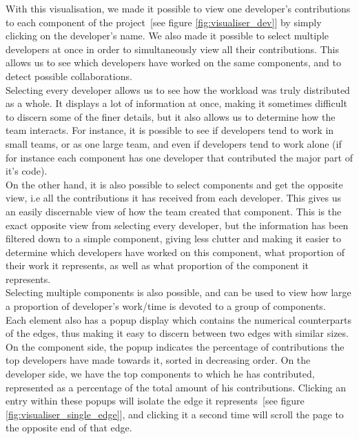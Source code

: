 With this visualisation, we made it possible to view one developer's contributions to each component of the project~[see figure \ref{fig:visualiser_dev}] by simply clicking on the developer's name. We also made it possible to select multiple developers at once in order to simultaneously view all their contributions. This allows us to see which developers have worked on the same components, and to detect possible collaborations.\\
Selecting every developer allows us to see how the workload was truly distributed as a whole. It displays a lot of information at once, making it sometimes difficult to discern some of the finer details, but it also allows us to determine how the team interacts.
For instance, it is possible to see if developers tend to work in small teams, or as one large team, and even if developers tend to work alone (if for instance each component has one developer that contributed the major part of it's code).\\[0.3cm]

On the other hand, it is also possible to select components and get the opposite view, i.e all the contributions it has received from each developer. This gives us an easily discernable view of how the team created that component. This is the exact opposite view from selecting every developer, but the information has been filtered down to a simple component, giving less clutter and making it easier to determine which developers have worked on this component, what proportion of their work it represents, as well as what proportion of the component it represents.\\
Selecting multiple components is also possible, and can be used to view how large a proportion of developer's work/time is devoted to a group of components.\\[0.3cm]

Each element also has a popup display which contains the numerical counterparts of the edges, thus making it easy to discern between two edges with similar sizes.
On the component side, the popup indicates the percentage of contributions the top developers have made towards it, sorted in decreasing order. On the developer side, we have the top components to which he has contributed, represented as a percentage of the total amount of his contributions.
Clicking an entry within these popups will isolate the edge it represents~[see figure \ref{fig:visualiser_single_edge}], and clicking it a second time will scroll the page to the opposite end of that edge.
